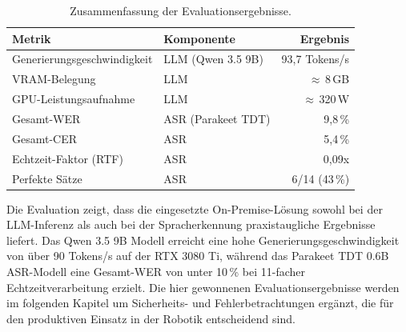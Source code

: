 \begin{table}[H]
    \centering
    \small
    \begin{tabular}{l l r}
        \toprule
        Metrik & Komponente & Ergebnis \\
        \midrule
        Generierungsgeschwindigkeit & LLM (Qwen 3.5 9B) & 93,7 Tokens/s \\
        VRAM-Belegung & LLM & $\approx$\,8\,GB \\
        GPU-Leistungsaufnahme & LLM & $\approx$\,320\,W \\
        \midrule
        Gesamt-WER & ASR (Parakeet TDT) & 9,8\,\% \\
        Gesamt-CER & ASR & 5,4\,\% \\
        Echtzeit-Faktor (RTF) & ASR & 0,09x \\
        Perfekte Sätze & ASR & 6/14 (43\,\%) \\
        \bottomrule
    \end{tabular}
    \caption{Zusammenfassung der Evaluationsergebnisse.}
    \label{tab:eval_zusammenfassung}
\end{table}

Die Evaluation zeigt, dass die eingesetzte On-Premise-Lösung sowohl bei der
LLM-Inferenz als auch bei der Spracherkennung praxistaugliche Ergebnisse liefert.
Das Qwen 3.5 9B Modell erreicht eine hohe Generierungsgeschwindigkeit von über
90 Tokens/s auf der RTX 3080 Ti, während das Parakeet TDT 0.6B ASR-Modell
eine Gesamt-WER von unter 10\,\% bei 11-facher Echtzeitverarbeitung erzielt.
Die hier gewonnenen Evaluationsergebnisse werden im folgenden Kapitel um
Sicherheits- und Fehlerbetrachtungen ergänzt, die für den produktiven Einsatz
in der Robotik entscheidend sind.
